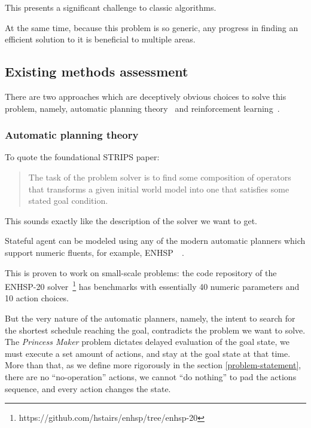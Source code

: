 \documentclass[12pt, a4paper]{article}
\begin{document}
	This presents a significant challenge to classic algorithms.
	
	At the same time, because this problem is so generic, any progress in finding an efficient solution to it is beneficial to multiple areas.
	
	\subsection{Existing methods assessment}\label{introduction:assessment}

	There are two approaches which are deceptively obvious choices to solve this problem, namely, automatic planning theory~\cite{fikes1971strips} and reinforcement learning~\cite{sutton2018reinforcement}.
	
  \subsubsection{Automatic planning theory}
  
  To quote the foundational STRIPS paper:
  
  \blockcquote[p.~190]{fikes1971strips}
  {The task of the problem solver is to find some composition of operators that transforms a given initial world model into one that satisfies some stated goal condition.}
  
  This sounds exactly like the description of the solver we want to get.
  
  	Stateful agent can be modeled using any of the modern automatic planners which support numeric fluents, for example, ENHSP~\cite{enhsp::scala2020subgoaling}~\cite{enhsp::Scala2016IntervalBasedRF}.
	
	This is proven to work on small-scale problems: the code repository of the ENHSP-20 solver~\footnote{https://github.com/hstairs/enhsp/tree/enhsp-20} has benchmarks with essentially 40 numeric parameters and 10 action choices.
	
	But the very nature of the automatic planners, namely, the intent to search for the shortest schedule reaching the goal, contradicts the problem we want to solve.
	The \textit{Princess Maker} problem dictates delayed evaluation of the goal state, we must execute a set amount of actions, and stay at the goal state at that time.
	More than that, as we define more rigorously in the section \ref{problem-statement}, there are no ``no-operation'' actions, we cannot ``do nothing'' to pad the actions sequence, and every action changes the state.
	
\end{document}
